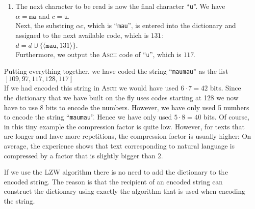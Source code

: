 \begin{enumerate}
\item The next character to be read is now the final character ``\texttt{u}''.  We have
      \\[0.2cm]
      \hspace*{1.3cm}
      $\alpha = \texttt{ma}$ \quad and \quad $c = \texttt{u}$.
      \\[0.2cm]
      Next, the substring $\alpha c$, which is ``\texttt{mau}'', is entered into the dictionary and
      assigned to the next available code, which is $131$:
      \\[0.2cm]
      \hspace*{1.3cm}
      $d = d \cup \{\langle \texttt{mau}, 131 \rangle\}$.
      \\[0.2cm]
      Furthermore, we output the \textsc{Ascii} code of ``\texttt{u}'', which is $117$.
\end{enumerate} 
Putting everything together, we have coded the string ``\texttt{maumau}'' as the list
\\[0.2cm]
\hspace*{1.3cm}
$[109,97,117,128,117]$
\\[0.2cm]
If we had encoded this string in \textsc{Ascii} we would have used $6 \cdot 7 = 42$ bits.  Since the
dictionary that we have built on the fly uses codes starting at 128 we now have to use 8 bits to
encode the numbers.  However, we have only used 5 numbers to encode the string ``\texttt{maumau}''.
Hence we have only used $5 \cdot 8 = 40$ bits.   Of course, in this tiny example the compression
factor is quite low.  However, for texts that are longer and have more repetitions, the compression
factor is usually higher: On average, the experience shows that text corresponding to natural
language is compressed by a factor that is slightly bigger than $2$.

If we use the LZW algorithm there is no need to add the dictionary to the encoded string.  The
reason is that the recipient of an encoded string can construct the dictionary using exactly the
algorithm that is used when encoding the string.

